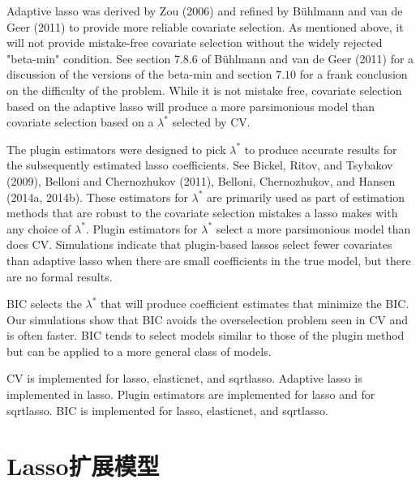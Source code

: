 Adaptive lasso was derived by Zou (2006) and refined by Bühlmann and van de Geer (2011) to provide more reliable covariate selection. As mentioned above, it will not provide mistake-free covariate selection without the widely rejected "beta-min" condition. See section 7.8.6 of Bühlmann and van de Geer (2011) for a discussion of the versions of the beta-min and section $7.10$ for a frank conclusion on the difficulty of the problem. While it is not mistake free, covariate selection based on the adaptive lasso will produce a more parsimonious model than covariate selection based on a $\lambda^{*}$ selected by CV.

The plugin estimators were designed to pick $\lambda^{*}$ to produce accurate results for the subsequently estimated lasso coefficients. See Bickel, Ritov, and Tsybakov (2009), Belloni and Chernozhukov (2011), Belloni, Chernozhukov, and Hansen (2014a, 2014b). These estimators for $\lambda^{*}$ are primarily used as part of estimation methods that are robust to the covariate selection mistakes a lasso makes with any choice of $\lambda^{*}$. Plugin estimators for $\lambda^{*}$ select a more parsimonious model than does $\mathrm{CV}$. Simulations indicate that plugin-based lassos select fewer covariates than adaptive lasso when there are small coefficients in the true model, but there are no formal results.

BIC selects the $\lambda^{*}$ that will produce coefficient estimates that minimize the BIC. Our simulations show that BIC avoids the overselection problem seen in CV and is often faster. BIC tends to select models similar to those of the plugin method but can be applied to a more general class of models.

$\mathrm{CV}$ is implemented for lasso, elasticnet, and sqrtlasso. Adaptive lasso is implemented in lasso. Plugin estimators are implemented for lasso and for sqrtlasso. BIC is implemented for lasso, elasticnet, and sqrtlasso.

\fi      %


\section{Lasso扩展模型}

